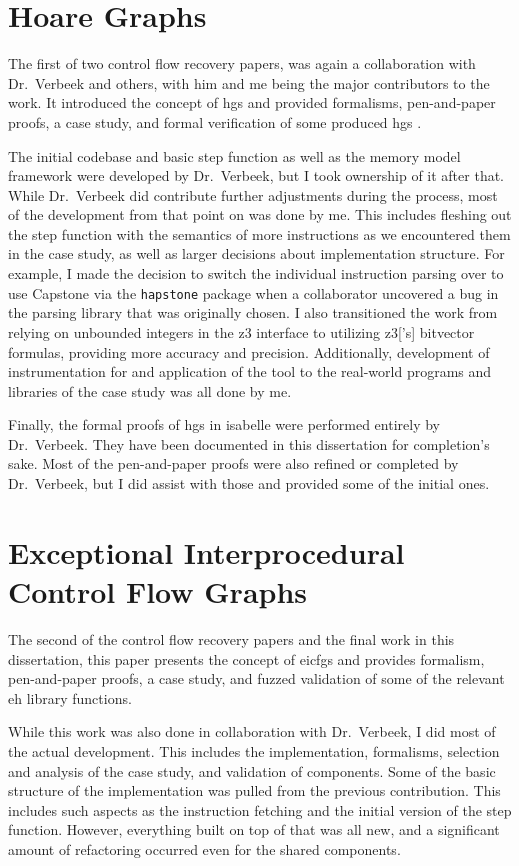 \section*{Hoare Graphs}
The first of two control flow recovery papers,  was again a collaboration with Dr.~Verbeek and others, with him and me being the major contributors to the work.
It introduced the concept of \acp{hg} and provided formalisms, pen-and-paper proofs, a case study, and formal verification of some produced \acp{hg} \autocite{verbeek2022lifting}.

The initial codebase and basic step function as well as the memory model framework were developed by Dr.~Verbeek, but I took ownership of it after that.
While Dr.~Verbeek did contribute further adjustments during the process, most of the development from that point on was done by me.
This includes fleshing out the step function with the semantics of more instructions as we encountered them in the case study, as well as larger decisions about implementation structure.
For example, I made the decision to switch the individual instruction parsing over to use Capstone \autocite{capstone} via the \texttt{hapstone} package \autocite{hapstone} when a collaborator uncovered a bug in the parsing library that was originally chosen.
I also transitioned the work from relying on unbounded integers in the \gls{z3} interface to utilizing \gls{z3}['s] bitvector formulas, providing more accuracy and precision.
Additionally, development of instrumentation for and application of the tool to the real-world programs and libraries of the case study was all done by me.

Finally, the formal proofs of \acp{hg} in \gls{isabelle} were performed entirely by Dr.~Verbeek.
They have been documented in this dissertation for completion's sake.
Most of the pen-and-paper proofs were also refined or completed by Dr.~Verbeek, but I did assist with those and provided some of the initial ones.

\section*{Exceptional Interprocedural Control Flow Graphs}
The second of the control flow recovery papers and the final work in this dissertation, this paper presents the concept of \acp{eicfg} and provides formalism, pen-and-paper proofs, a case study, and fuzzed validation of some of the relevant \ac{eh} library functions.

While this work was also done in collaboration with Dr.~Verbeek, I did most of the actual development.
This includes the implementation, formalisms, selection and analysis of the case study, and validation of components.
Some of the basic structure of the implementation was pulled from the previous contribution.
This includes such aspects as the instruction fetching and the initial version of the step function.
However, everything built on top of that was all new, and a significant amount of refactoring occurred even for the shared components.
